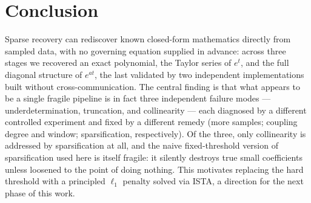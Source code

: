 \documentclass[11pt]{article}
\begin{document}
\section{Conclusion}

Sparse recovery can rediscover known closed-form mathematics directly from sampled data,
with no governing equation supplied in advance: across three stages we recovered an
exact polynomial, the Taylor series of $e^{t}$, and the full diagonal structure of
$e^{at}$, the last validated by two independent implementations built without
cross-communication. The central finding is that what appears to be a single fragile
pipeline is in fact three independent failure modes --- underdetermination, truncation,
and collinearity --- each diagnosed by a different controlled experiment and fixed by a
different remedy (more samples; coupling degree and window; sparsification,
respectively). Of the three, only collinearity is addressed by sparsification at all,
and the naive fixed-threshold version of sparsification used here is itself fragile: it
silently destroys true small coefficients unless loosened to the point of doing nothing.
This motivates replacing the hard threshold with a principled $\ell_1$ penalty solved via
ISTA, a direction for the next phase of this work.
\end{document}
